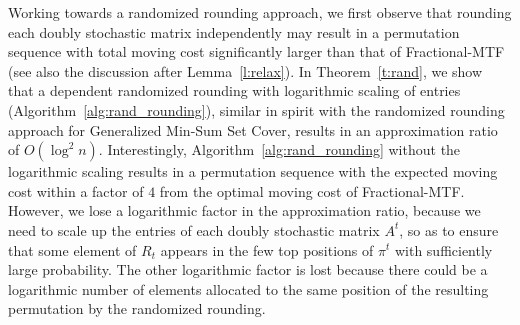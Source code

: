 
Working towards a randomized rounding approach, we first observe that rounding each doubly stochastic matrix independently may result in a permutation sequence with total moving cost significantly larger than that of Fractional-MTF (see also the discussion after Lemma~\ref{l:relax}). In Theorem~\ref{t:rand}, we show that a dependent randomized rounding with  logarithmic scaling of entries  (Algorithm~\ref{alg:rand_rounding}), similar in spirit with the randomized rounding approach \cite{BGK10,SW11} for Generalized Min-Sum Set Cover, results in an approximation ratio of $O(\log^2 n)$. Interestingly, Algorithm~\ref{alg:rand_rounding} without the logarithmic scaling results in a permutation sequence with the expected moving cost within a factor of $4$ from the optimal moving cost of Fractional-MTF. However, we lose a logarithmic factor in the approximation ratio, because we need to scale up the entries of each doubly stochastic matrix $A^t$, so as to ensure that some element of $R_t$ appears in the few top positions of $\pi^t$ with sufficiently large probability. The other logarithmic factor is lost because there could be a logarithmic number of elements allocated to the same position of the resulting permutation by the randomized rounding. 

